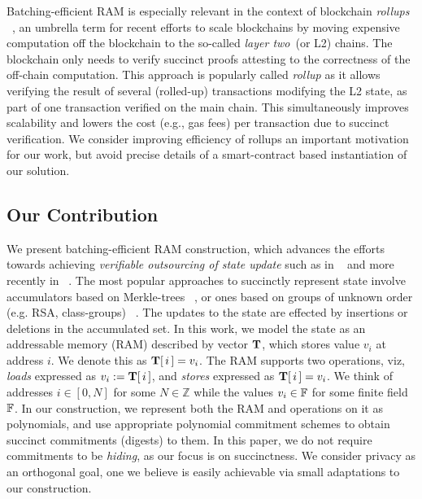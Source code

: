  Batching-efficient RAM is especially relevant in the context of blockchain {\em rollups} ~\cite{rollup},
an umbrella term for recent efforts to scale blockchains by moving expensive computation off the blockchain to the so-called {\em layer two}~(or L2) chains. The blockchain only needs to verify succinct proofs attesting to the correctness of the off-chain computation. This approach is popularly called \textit{rollup} as it allows verifying the result of several (rolled-up) transactions modifying the L2 state, as part of one transaction verified on the main chain.
This simultaneously improves scalability and lowers the cost (e.g., gas fees) per transaction due to succinct verification. We consider improving efficiency of rollups an important motivation for our work, but avoid precise details of a smart-contract based
instantiation of our solution.

\subsection{Our Contribution}\label{subsec:ourwork} 
We present batching-efficient RAM construction, which advances the efforts
towards achieving {\em verifiable outsourcing of state update} such as in ~\cite{EPRINT:BFRSBW13}
and more recently in ~\cite{USENIX:OWWB20, CCS:CFHKKO22}.
The most popular approaches to succinctly represent
state involve accumulators based on Merkle-trees ~\cite{C:Merkle87}, or ones based on groups of unknown order
(e.g. RSA, class-groups) ~\cite{C:CamLys02,C:BonBunFis19,USENIX:OWWB20, CCS:CFHKKO22}.
The updates to the state are effected by insertions or deletions in the  accumulated set.
In this work, we
model the state as an addressable memory (RAM) described by vector $\mathbf{T}$, which stores value $v_i$ at address $i$.
We denote this as $\mathbf{T}[\,i\,]=v_i$. The RAM supports two operations, viz, {\em loads} expressed
as $v_i := \mathbf{T}[\,i\,]$, and {\em stores} expressed as $\mathbf{T}[\,i\,]=v_i$.
We think of addresses $i\in [0,N]$ for some $N\in \mathbb{Z}$ while the
values $v_i\in \mathbb{F}$ for some finite field $\mathbb{F}$. In our construction, we represent both the RAM and operations on it
as polynomials, and use appropriate polynomial commitment schemes to obtain succinct commitments (digests) to them.
In this paper, we do not require commitments to be {\em hiding}, as our focus is on succinctness.
We consider privacy as an orthogonal goal, one we believe is easily achievable
via small adaptations to our construction.\smallskip


